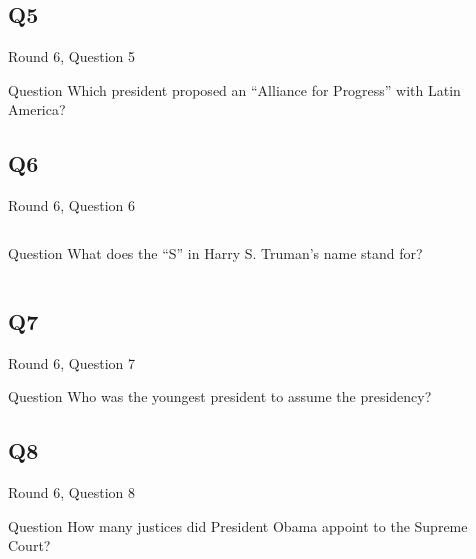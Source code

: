 \documentclass[11pt]{beamer}
\begin{document}
\subsection*{Q5}
\begin{frame}[t]{Round 6, Question 5}
\vspace{0.5em}
\begin{block}{Question}
Which president proposed an ``Alliance for Progress'' with Latin America?
\end{block}
\end{frame}
    

\subsection*{Q6}
\begin{frame}[t]{Round 6, Question 6}
\vspace{0.5em}
\begin{columns}[T,totalwidth=\linewidth]
\begin{column}{0.25\linewidth}
\begin{block}{Question}
What does the ``S'' in Harry S. Truman's name stand for?
\end{block}
\end{column}
\begin{column}{0.7\linewidth}
\begin{center}
\texttt{[image: \{Images/truman]}.png}
\end{center}
\end{column}
\end{columns}
\end{frame}
    

\subsection*{Q7}
\begin{frame}[t]{Round 6, Question 7}
\vspace{0.5em}
\begin{block}{Question}
Who was the youngest president to assume the presidency?
\end{block}
\end{frame}
    

\subsection*{Q8}
\begin{frame}[t]{Round 6, Question 8}
\vspace{0.5em}
\begin{block}{Question}
How many justices did President Obama appoint to the Supreme Court?
\end{block}
\end{frame}
    
\end{document}
